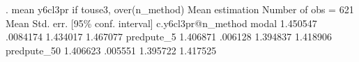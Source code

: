 . mean y6cl3pr if touse3, over(n_method)
{\smallskip}
Mean estimation                                  Number of obs = 621
{\smallskip}
                   {\VBAR}       Mean   Std. err.     [95\% conf. interval]
c.y6cl3pr@n_method {\VBAR}
            modal  {\VBAR}   1.450547   .0084174      1.434017    1.467077
       predpute_5  {\VBAR}   1.406871    .006128      1.394837    1.418906
      predpute_50  {\VBAR}   1.406623    .005551      1.395722    1.417525
